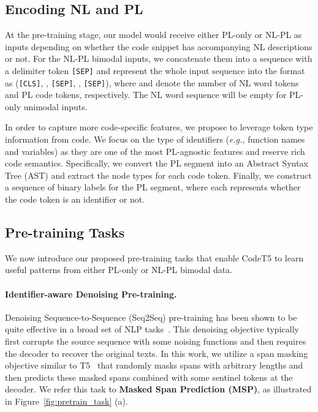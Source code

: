 \documentclass[11pt]{article}
\newcommand{\eg}{{\em e.g.,}\xspace}
\begin{document}
\subsection{Encoding NL and PL}\label{model:input}
At the pre-training stage, our model would receive either PL-only or NL-PL as inputs depending on whether the code snippet has accompanying NL descriptions or not. For the NL-PL bimodal inputs, we concatenate them into a sequence with a delimiter token  \texttt{[SEP]} and represent the whole input sequence into the format as   (\texttt{[CLS]}, , \texttt{[SEP]}, , \texttt{[SEP]}), where  and  denote the number of NL word tokens  and PL code tokens, respectively. The NL word sequence will be empty for PL-only unimodal inputs. 

In order to capture more code-specific features, we propose to leverage token type information from code. We focus on the type of identifiers (\eg function names and variables) as they are one of the most PL-agnostic features and reserve rich code semantics.
Specifically, we convert the PL segment into an Abstract Syntax Tree (AST) and extract the node types for each code token. Finally, we construct a sequence of binary labels  for the PL segment, where each  represents whether the code token  is an identifier or not.


\subsection{Pre-training Tasks}\label{model:pretrain}

We now introduce our proposed pre-training tasks that enable CodeT5 to learn useful patterns from either PL-only or NL-PL bimodal data. 

\paragraph{Identifier-aware Denoising Pre-training.}
Denoising Sequence-to-Sequence (Seq2Seq) pre-training has been shown to be quite effective in a broad set of NLP tasks~\cite{DBLP:conf/icml/SongTQLL19,DBLP:journals/jmlr/RaffelSRLNMZLL20,DBLP:conf/acl/LewisLGGMLSZ20}. This denoising objective typically first corrupts the source sequence with some noising functions and then requires the decoder to recover the original texts.
In this work, we utilize a  span masking objective similar to T5~\cite{DBLP:journals/jmlr/RaffelSRLNMZLL20} that randomly masks spans with arbitrary lengths and then predicts these masked spans combined with some sentinel tokens at the decoder.
We refer this task to \textbf{Masked Span Prediction (MSP)}, as illustrated in Figure~\ref{fig:pretrain_task} (a).
\end{document}

